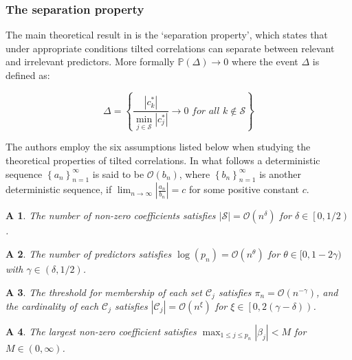 \documentclass[11pt]{report}\usepackage[utf8]{inputenc}
\newtheorem{assump}{A}
\begin{document}
\subsubsection{The separation property}

The main theoretical result in \cite{cho2012high} is the `separation property', which states that under appropriate conditions tilted correlations can separate between relevant and irrelevant predictors. More formally $\mathbb{P}\left ( \Delta  \right )\rightarrow 0$ where the event $\Delta$ is defined as: 

\begin{equation*}
    \Delta = \left \{  \frac{|c_k^*|}{\min_{j \in \mathcal{S}}|c_j^*|} \rightarrow 0 \textit{  for all  } k \notin \mathcal{S} \right \}
\end{equation*}

The authors employ the six assumptions listed below when studying the theoretical properties of tilted correlations. In what follows a deterministic sequence $\left \{ a_n \right \}_{n=1}^\infty$ is said to be $\mathcal{O}(b_n)$, where $\left \{ b_n \right \}_{n=1}^\infty$ is another deterministic sequence, if $\lim_{n \rightarrow \infty} \left | \frac{a_n}{b_n} \right | = c $ for some positive constant $c$.  

\begin{assump} \label{A1}
    The number of non-zero coefficients satisfies $\left | \mathcal{S} \right | = \mathcal{O}\left ( n^\delta \right )$ for $\delta \in \left [ 0,1/2 \right )$.
\end{assump}

\begin{assump} \label{A2}
    The number of predictors satisfies $\log\left ( p_n \right ) = \mathcal{O}\left ( n^\theta \right )$ for $\theta \in [0,1-2\gamma) $ with  $\gamma \in  \left ( \delta, 1/2 \right )$. 
\end{assump}

\begin{assump} \label{A3}
The threshold for membership of each set $\mathcal{C}_j$ satisfies $\pi_{n} = \mathcal{O}\left ( n^{-\gamma} \right )$, and the cardinality of each $\mathcal{C}_j$ satisfies $\left | \mathcal{C}_j \right | = \mathcal{O}\left ( n^{\xi } \right )$ for $ \xi \in \left [  0, 2\left ( \gamma - \delta  \right ) \right ) $.
\end{assump} 

\begin{assump} \label{A4}
    The largest non-zero coefficient satisfies $\max_{1 \leq j \leq p_n} \left | \beta_j \right | < M $ for $M \in \left ( 0, \infty \right )$.
\end{assump}
\end{document}
